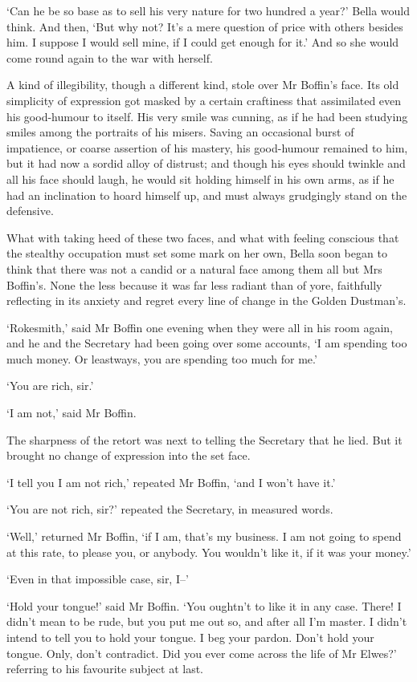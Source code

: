 ‘Can he be so base as to sell his very nature for two hundred a year?’
Bella would think. And then, ‘But why not? It’s a mere question of price
with others besides him. I suppose I would sell mine, if I could get
enough for it.’ And so she would come round again to the war with
herself.

A kind of illegibility, though a different kind, stole over Mr
Boffin’s face. Its old simplicity of expression got masked by a certain
craftiness that assimilated even his good-humour to itself. His very
smile was cunning, as if he had been studying smiles among the portraits
of his misers. Saving an occasional burst of impatience, or coarse
assertion of his mastery, his good-humour remained to him, but it had
now a sordid alloy of distrust; and though his eyes should twinkle and
all his face should laugh, he would sit holding himself in his own
arms, as if he had an inclination to hoard himself up, and must always
grudgingly stand on the defensive.

What with taking heed of these two faces, and what with feeling
conscious that the stealthy occupation must set some mark on her own,
Bella soon began to think that there was not a candid or a natural face
among them all but Mrs Boffin’s. None the less because it was far less
radiant than of yore, faithfully reflecting in its anxiety and regret
every line of change in the Golden Dustman’s.

‘Rokesmith,’ said Mr Boffin one evening when they were all in his room
again, and he and the Secretary had been going over some accounts, ‘I
am spending too much money. Or leastways, you are spending too much for
me.’

‘You are rich, sir.’

‘I am not,’ said Mr Boffin.

The sharpness of the retort was next to telling the Secretary that he
lied. But it brought no change of expression into the set face.

‘I tell you I am not rich,’ repeated Mr Boffin, ‘and I won’t have it.’

‘You are not rich, sir?’ repeated the Secretary, in measured words.

‘Well,’ returned Mr Boffin, ‘if I am, that’s my business. I am not going
to spend at this rate, to please you, or anybody. You wouldn’t like it,
if it was your money.’

‘Even in that impossible case, sir, I--’

‘Hold your tongue!’ said Mr Boffin. ‘You oughtn’t to like it in any
case. There! I didn’t mean to be rude, but you put me out so, and after
all I’m master. I didn’t intend to tell you to hold your tongue. I beg
your pardon. Don’t hold your tongue. Only, don’t contradict. Did you
ever come across the life of Mr Elwes?’ referring to his favourite
subject at last.

